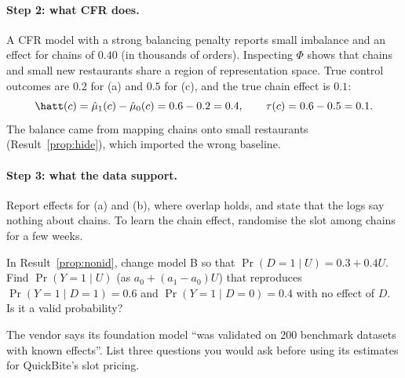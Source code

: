 \documentclass[11pt]{article}
\begin{document}
\paragraph{Step 2: what CFR does.} A CFR model with a strong balancing penalty reports small imbalance and an effect for
chains of $0.40$ (in thousands of orders). Inspecting $\Phi$ shows that chains and small new restaurants share a region of
representation space. True control outcomes are $0.2$ for (a) and $0.5$ for (c), and the true chain effect is $0.1$:
\[
  \hatt(c) = \hat\mu_1(c) - \hat\mu_0(c) = 0.6 - 0.2 = 0.4, \qquad \tau(c) = 0.6 - 0.5 = 0.1 .
\]
The balance came from mapping chains onto small restaurants (Result~\ref{prop:hide}), which imported the wrong
baseline.

\paragraph{Step 3: what the data support.} Report effects for (a) and (b), where overlap holds, and state that the logs say
nothing about chains. To learn the chain effect, randomise the slot among chains for a few weeks.

\begin{exercise}[computation]
In Result~\ref{prop:nonid}, change model B so that $\Pr(D=1 \mid U) = 0.3 + 0.4U$. Find $\Pr(Y=1 \mid U)$ (as $a_0 + (a_1 - a_0)U$)
that reproduces $\Pr(Y=1 \mid D=1) = 0.6$ and $\Pr(Y=1 \mid D=0) = 0.4$ with no effect of $D$. Is it a valid probability?
\end{exercise}

\begin{exercise}[judgement]
The vendor says its foundation model ``was validated on 200 benchmark datasets with known effects''. List three
questions you would ask before using its estimates for QuickBite's slot pricing.
\end{exercise}
\end{document}
